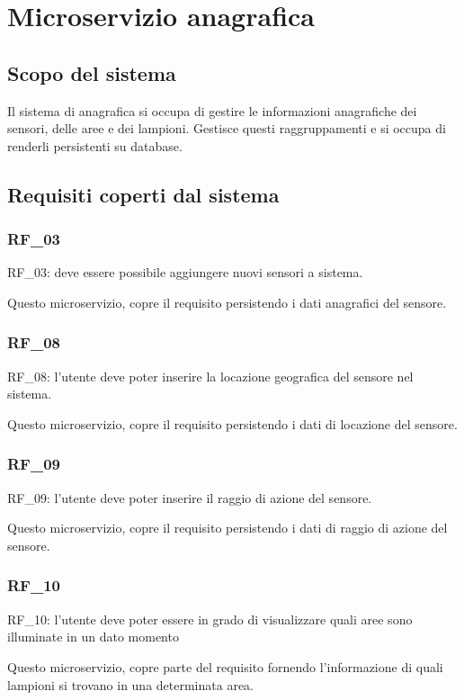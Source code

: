 \chapter{Microservizio anagrafica}\label{cap:microservizio-anagrafica}

\section{Scopo del sistema}

Il sistema di anagrafica si occupa di gestire le informazioni anagrafiche dei sensori, delle aree e dei lampioni. Gestisce questi raggruppamenti e si occupa di renderli persistenti su database.

\section{Requisiti coperti dal sistema}

\subsection{RF\_03}
RF\_03: deve essere possibile aggiungere nuovi sensori a sistema.

Questo microservizio, copre il requisito persistendo i dati anagrafici del sensore.

\subsection{RF\_08}
RF\_08: l'utente deve poter inserire la locazione geografica del sensore nel sistema.

Questo microservizio, copre il requisito persistendo i dati di locazione del sensore.

\subsection{RF\_09}
RF\_09: l'utente deve poter inserire il raggio di azione del sensore.

Questo microservizio, copre il requisito persistendo i dati di raggio di azione del sensore.

\subsection{RF\_10}
RF\_10: l'utente deve poter essere in grado di visualizzare quali aree sono illuminate in un dato momento

Questo microservizio, copre parte del requisito fornendo l'informazione di quali lampioni si trovano in una determinata area.



